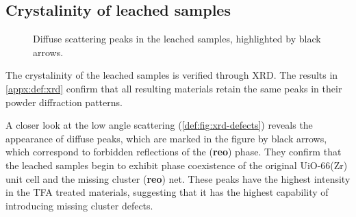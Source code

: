 
\subsection{Crystalinity of leached samples}\label{def:xrd}

\begin{wrapfigure}[13]{r}{0.3\textwidth}
    \centering
    \captionsetup{format=plain}
    \caption{Diffuse scattering peaks in the  leached 
    samples, highlighted by black arrows.}%
    \label{def:fig:xrd-defects}
\end{wrapfigure}

The crystalinity of the leached samples is verified through 
XRD. The results in \autoref{appx:def:xrd} confirm that all 
resulting materials retain the same peaks in their powder
diffraction patterns.

A closer look at the low angle scattering (\autoref{def:fig:xrd-defects})
reveals the appearance of diffuse peaks, which are marked in the 
figure by black arrows, which correspond to forbidden
reflections of the (\textbf{reo}) phase. They confirm that the 
leached samples begin to exhibit phase coexistence of 
the original UiO-66(Zr) unit cell and the missing cluster
(\textbf{reo}) net. These peaks have the highest intensity in 
the TFA treated materials, suggesting that it has the highest 
capability of introducing missing cluster defects.